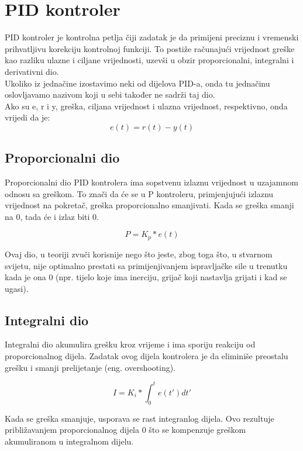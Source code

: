 \documentclass[../Document.tex]{subfiles}
\begin{document}
\section{PID kontroler} \label{pid}
PID kontroler je kontrolna petlja čiji zadatak je da primijeni preciznu i vremenski prihvatljivu korekciju kontrolnoj funkciji. To postiže računajući vrijednost greške kao razliku ulazne i ciljane vrijednosti, uzevši u obzir proporcionalni, integralni i derivativni dio.\\

\noindent Ukoliko iz jednačine izostavimo neki od dijelova PID-a, onda tu jednačinu oslovljavamo nazivom koji u sebi također ne sadrži taj dio.
\\

\noindent Ako su e, r i y, greška, ciljana vrijednost i ulazna vrijednost, respektivno, onda vrijedi da je:
$$
    e(t) = r(t) - y(t)
$$
\subsection{Proporcionalni dio}
Proporcionalni dio PID kontrolera ima sopstvenu izlaznu vrijednost u uzajamnom odnosu sa greškom. To znači da će se u P kontroleru, primjenjujući izlaznu vrijednost na pokretač, greška proporcionalno smanjivati. Kada se greška smanji na 0, tada će i izlaz biti 0.

$$
    P=K_p*e(t)
$$

\noindent Ovaj dio, u teoriji zvuči korisnije nego što jeste, zbog toga što, u stvarnom svijetu, nije optimalno prestati sa primijenjivanjem ispravljačke sile u trenutku kada je ona 0 (npr. tijelo koje ima inerciju, grijač koji nastavlja grijati i kad se ugasi).


\subsection{Integralni dio}
Integralni dio akumulira grešku kroz vrijeme i ima sporiju reakciju od proporcionalnog dijela. Zadatak ovog dijela kontrolera je da eliminiše preostalu grešku i smanji prelijetanje (eng. overshooting).

$$
    I=K_i*\int_{0}^{t}e(t')dt'
$$

\noindent Kada se greška smanjuje, usporava se rast integranlog dijela. Ovo rezultuje približavanjem proporcionalnog dijela 0 što se kompenzuje greškom akumuliranom u integralnom dijelu.

\end{document}
